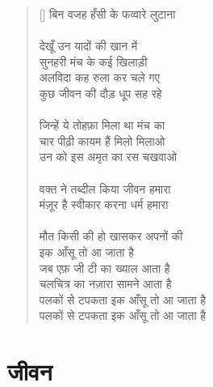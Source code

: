 \begin{verse}[\versewidth]
{बिन वजह हँसी के फव्वारे लुटाना\\
\\
देखूँ उन यादों की खान में\\
सुनहरी मंच के कई खिलाड़ी\\
अलविदा कह रुला कर चले गए\\
कुछ जीवन की दौड़ धूप सह रहे\\
\\
जिन्हें ये तोहफ़ा मिला था मंच का\\
चार पीढ़ी कायम हैं मिलो मिलाओ\\
उन को इस अमृत का रस चखवाओ\\
\\
वक्त ने तब्दील किया जीवन हमारा\\
मंज़ूर है स्वीकार करना धर्म हमारा\\
\\
मौत किसी की हो खासकर अपनों की\\
इक आँसू तो आ जाता है\\
जब एफ़ जी टी का ख्याल आता है\\
चलचित्र का नज़ारा सामने आता है\\
पलकों से टपकता इक आँसू तो आ जाता है\\
पलकों से टपकता इक आँसू तो आ जाता है
}
\end{verse}


\chapter{\texthindi{जीवन}}

